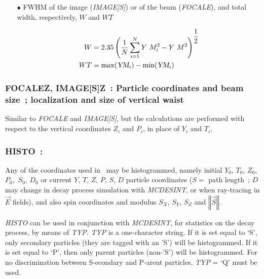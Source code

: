 {\begin{itemize}
$$ \YM = \dfrac{1 }{ N} \sum^ N_{i=1}(Y_i+X  \text{tg} T_i)-Y=
      \dfrac{1 }{ N} \sum^ N_{i=1}Y\, M_i $$

\item[$\bullet$]FWHM of the image (\textsl{IMAGE[S]}) or of the beam 
(\textsl{FOCALE}), and  total width, respectively, $ W $ and $ WT $

\begin{align*}
	W &   =     2.35 \left( \dfrac{1 }{ N} \sum^ N_{i=1}Y\ M^2_i - Y\ M^2 \right)^{\dfrac{1}{2}} \\ 
	WT &   =    \max (\textsl{YM}_i)- \min  (\textsl{YM}_i)  
\end{align*}
\end{itemize}



\newpage

\subsubsection{FOCALEZ, IMAGE[S]Z~: Particle coordinates and beam size~;  localization and 
size  of  vertical waist}\label{FOCALEZ}\label{IMAGEZ}\label{IMAGESZ}
\medskip 
          
Similar to \textsl{FOCALE} and \textsl{IMAGE[S]}, but the calculations are performed 
with respect to the vertical coordinates $ Z_i $ and $ P_i $, in place of $Y_i $ 
and $ T_i$. 
\vfill

\newpage

\subsubsection{HISTO~: \HISTOTitl}\label{HISTO} 
\medskip

Any of the coordinates used in \zgou\ may be histogrammed,
namely initial  $ Y_0$,  $ T_0$,  $ Z_0$,  $ P_0, $ $ S_0 $, $ D_0 $  or current 
$ Y$, $T$, $Z$, $P$, $S$, $D$ particle coordinates ($ S=$ path length~;  
$ D $ may change  in decay process simulation with \textsl{MCDESINT}, 
or when ray-tracing in $ \vec  E $ fields), and also spin coordinates and
modulus $ S_X$, $ S_Y$,  $ S_Z $ and $ \left\Vert\vec  S \right\Vert   $.  
\medskip

\noindent\textsl{HISTO}  can be used in conjunction with 
\textsl{MCDESINT}, for statistics 
on the decay process, by means of \textsl{TYP}.  \textsl{TYP} is a one-character string.  
If it is set equal to `S', only secondary particles (they are tagged with an 'S') will be    
histogrammed.  If it is set equal to `P', then only  parent particles (non-'S') will be histogrammed.  
For no discrimination  between S-econdary and P-arent particles,  \textsl{TYP} = `Q'  must be
used.  
\medskip

}
